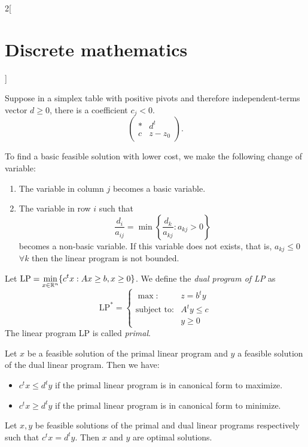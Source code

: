 \documentclass[../../../main.tex]{subfiles}
\begin{document}
\begin{multicols}{2}[\section{Discrete mathematics}]
\begin{definition}
\end{definition}
\begin{prop}
Suppose in a simplex table with positive pivots and therefore independent-terms vector $d\geq 0$, there is a coefficient $c_j<0$. $$\left(\begin{array}{c|c}
    * & d^t\\
    \hline
    c & z-z_0
\end{array}\right).$$
\end{prop}
To find a basic feasible solution with lower cost, we make the following change of variable:
\begin{enumerate}
    \item The variable in column $j$ becomes a basic variable.
    \item The variable in row $i$ such that $$\frac{d_i}{a_{ij}}=\min\left\{\frac{d_k}{a_{kj}}:a_{kj}>0\right\}$$ becomes a non-basic variable. If this variable does not exists, that is, $a_{kj}\leq0$ $\forall k$ then the linear program is not bounded.
\end{enumerate}
\begin{definition}
Let $\text{LP}=\displaystyle\min_{x\in\mathbb{R} ^n}\{c^tx:Ax\geq b,x\geq 0\}$. We define the \textit{dual program of LP} as $$\text{LP}^*=\left\{\begin{array}{rc}
    \max: & z=b^ty \\
    \text{subject to}: & A^ty\leq c\\
     & y\geq 0
    \end{array}\right.$$ The linear program LP is called \textit{primal}.
\end{definition}
\begin{theorem}
Let $x$ be a feasible solution of the primal linear program and $y$ a feasible solution of the dual linear program. Then we have:
\begin{itemize}
    \item $c^tx\leq d^ty$ if the primal linear program is in canonical form to maximize.
    \item $c^tx\geq d^ty$ if the primal linear program is in canonical form to minimize.
\end{itemize}
\end{theorem}
\begin{corollary}
Let $x,y$ be feasible solutions of the primal and dual linear programs respectively such that $c^tx=d^ty$. Then $x$ and $y$ are optimal solutions.
\end{corollary}

\end{multicols}
\end{document}
